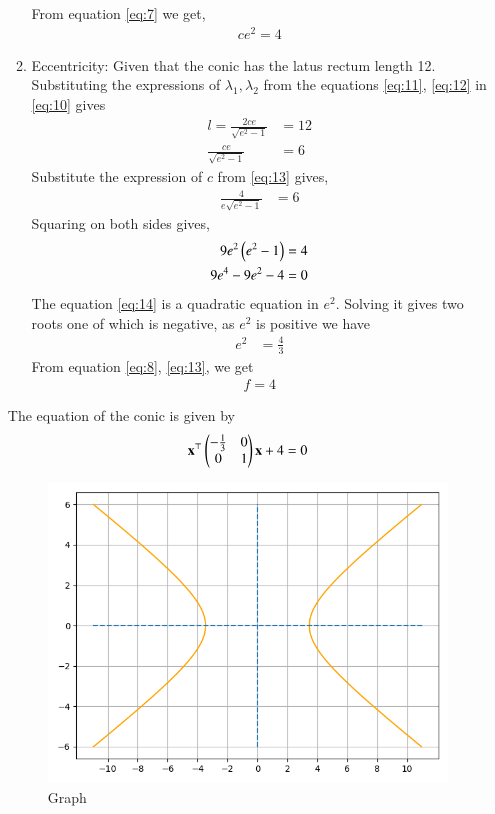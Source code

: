 \documentclass[journal,12pt,twocolumn]{IEEEtran}
\begin{document}
\begin{enumerate}
\begin{enumerate}
From equation \eqref{eq:7} we get,
\begin{align}
ce^2 = 4 \label{eq:13}
\end{align}
\item Eccentricity: Given that the conic has the latus rectum length 12. Substituting the expressions of $\lambda_1,\lambda_2$ from the equations \eqref{eq:11}, \eqref{eq:12} in \eqref{eq:10} gives
\begin{align}
l = \frac{2ce}{\sqrt{e^2-1}} &= 12\\
\frac{ce}{\sqrt{e^2-1}} &= 6
\end{align}
Substitute the expression of $c$ from \eqref{eq:13} gives,
\begin{align}
\frac{4}{e\sqrt{e^2-1}} &= 6
\end{align}
Squaring on both sides gives,
\begin{align}
9e^2\left(e^2-1\right) &= 4\\
9e^4-9e^2-4 &= 0
\label{eq:14}
\end{align}
The equation \eqref{eq:14} is a quadratic equation in $e^2$.
Solving it gives two roots one of which is negative, as $e^2$ is positive we have
\begin{align}
e^2 &= \frac{4}{3}
\end{align}
From equation \eqref{eq:8}, \eqref{eq:13}, we get
\begin{align}
f = 4
\end{align} 
\end{enumerate}
The equation of the conic is given by
\begin{align}
\mathbf{x}^\top\begin{pmatrix}-\frac{1}{3}&0\\0&1\end{pmatrix}\mathbf{x} +4 = 0
\end{align}
\begin{figure}[ht]
\centering
\includegraphics[width = \columnwidth]{"./figs/fig1.png"}
\caption{Graph}
\label{fig:1}
\end{figure}
\begin{table}[h]
\centering

\caption{}
\label{tab:1}
\end{table}
\end{enumerate}
\end{document}
